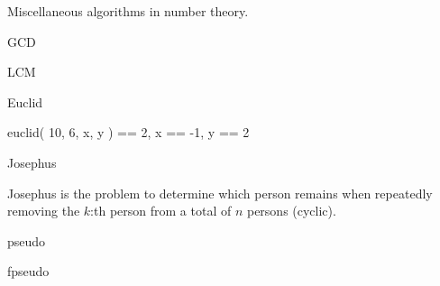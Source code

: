 
Miscellaneous algorithms in number theory.

\begin{algorithm}{GCD}
\end{algorithm}

\begin{algorithm}{LCM}
\end{algorithm}

\begin{algorithm}{Euclid}
\begin{example}
	euclid( 10, 6, x, y ) == 2, x == -1, y == 2
\end{example}
\end{algorithm}


\begin{algorithm}{Josephus}

Josephus is the problem to determine which person remains when repeatedly
removing the $k$:th person from a total of $n$ persons (cyclic).
\end{algorithm}


\begin{algorithm}{pseudo}
\end{algorithm}

\begin{algorithm}{fpseudo}
\characteristics{{\tt fpseudo} gives a pseudo-random number in $[0,1)$.}
\end{algorithm}

